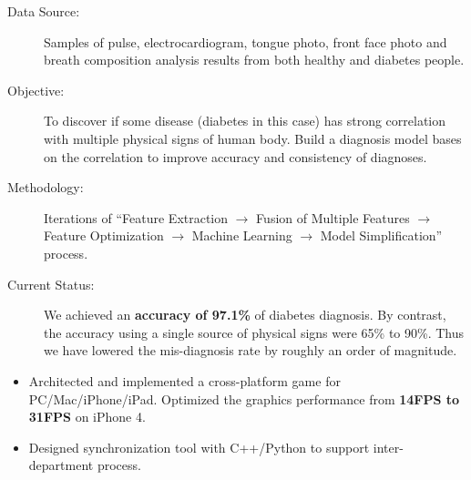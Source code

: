 \documentclass[10pt,a4paper]{moderncv/moderncv}
\begin{document}
{
\begin{description}
	\item[Data Source:] Samples of pulse, electrocardiogram, tongue photo, front face photo and breath composition analysis results from both healthy and diabetes people.
	\item[Objective:] To discover if some disease (diabetes in this case) has strong correlation with multiple physical signs of human body. Build a diagnosis model bases on the correlation to improve accuracy and consistency of diagnoses.
	\item[Methodology:] Iterations of ``Feature Extraction $\rightarrow$ Fusion of Multiple Features $\rightarrow$ Feature Optimization $\rightarrow$ Machine Learning $\rightarrow$ Model Simplification'' process.
	\item[Current Status:]  We achieved an \textbf{accuracy of 97.1\%} of diabetes diagnosis. By contrast, the accuracy using a single source of physical signs were 65\% to 90\%. Thus we have lowered the mis-diagnosis rate by roughly an order of magnitude.
\end{description}
}

{
\begin{itemize}
	\item Architected and implemented a cross-platform game for PC/Mac/iPhone/iPad. Optimized the graphics performance from \textbf{14FPS to 31FPS} on iPhone 4.
	\item Designed synchronization tool with C++/Python to support inter-department process.
\end{itemize}
}

\end{document}

